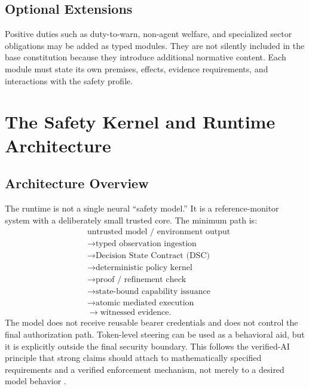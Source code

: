 \documentclass[11pt]{article}
\begin{document}
\subsection{Optional Extensions}
Positive duties such as duty-to-warn, non-agent welfare, and specialized sector obligations may be added as typed modules. They are not silently included in the base constitution because they introduce additional normative content. Each module must state its own premises, effects, evidence requirements, and interactions with the safety profile.

\section{The Safety Kernel and Runtime Architecture}\label{sec:engine}
\subsection{Architecture Overview}
The runtime is not a single neural ``safety model.'' It is a reference-monitor system with a deliberately small trusted core. The minimum path is:
\[
\begin{aligned}
&\text{untrusted model / environment output}\\
&\rightarrow \text{typed observation ingestion}\\
&\rightarrow \text{Decision State Contract (DSC)}\\
&\rightarrow \text{deterministic policy kernel}\\
&\rightarrow \text{proof / refinement check}\\
&\rightarrow \text{state-bound capability issuance}\\
&\rightarrow \text{atomic mediated execution}\\
&\rightarrow \text{witnessed evidence}.
\end{aligned}
\]
The model does not receive reusable bearer credentials and does not control the final authorization path. Token-level steering can be used as a behavioral aid, but it is explicitly outside the final security boundary. This follows the verified-AI principle that strong claims should attach to mathematically specified requirements and a verified enforcement mechanism, not merely to a desired model behavior \cite{seshia}.
\end{document}
